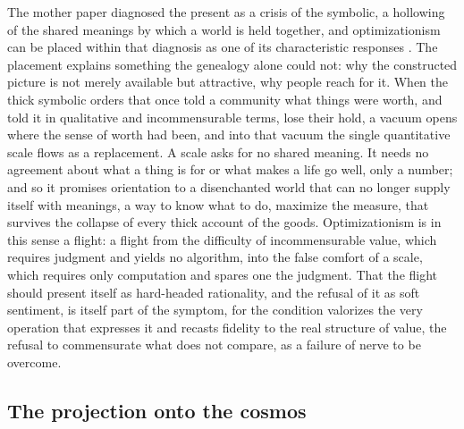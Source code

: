 The mother paper diagnosed the present as a crisis of the symbolic, a hollowing of the shared meanings by which a world is held together, and optimizationism can be placed within that diagnosis as one of its characteristic responses \parencite{wan2024grb}. The placement explains something the genealogy alone could not: why the constructed picture is not merely available but attractive, why people reach for it. When the thick symbolic orders that once told a community what things were worth, and told it in qualitative and incommensurable terms, lose their hold, a vacuum opens where the sense of worth had been, and into that vacuum the single quantitative scale flows as a replacement. A scale asks for no shared meaning. It needs no agreement about what a thing is for or what makes a life go well, only a number; and so it promises orientation to a disenchanted world that can no longer supply itself with meanings, a way to know what to do, maximize the measure, that survives the collapse of every thick account of the goods. Optimizationism is in this sense a flight: a flight from the difficulty of incommensurable value, which requires judgment and yields no algorithm, into the false comfort of a scale, which requires only computation and spares one the judgment. That the flight should present itself as hard-headed rationality, and the refusal of it as soft sentiment, is itself part of the symptom, for the condition valorizes the very operation that expresses it and recasts fidelity to the real structure of value, the refusal to commensurate what does not compare, as a failure of nerve to be overcome.

\subsection*{The projection onto the cosmos}

